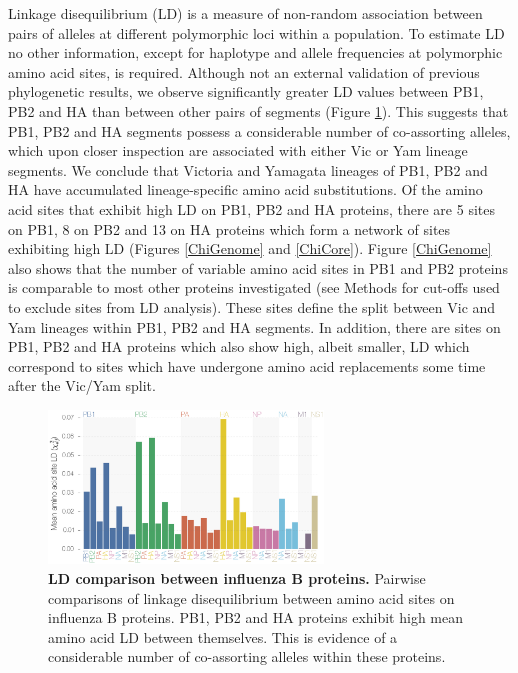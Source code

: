 \documentclass[11pt,oneside,letterpaper]{article}
\begin{document}
Linkage disequilibrium (LD) is a measure of non-random association between pairs of alleles at different polymorphic loci within a population.
To estimate LD no other information, except for haplotype and allele frequencies at polymorphic amino acid sites, is required.
Although not an external validation of previous phylogenetic results, we observe significantly greater LD values between PB1, PB2 and HA than between other pairs of segments (Figure \ref{segmentLD}).
This suggests that PB1, PB2 and HA segments possess a considerable number of co-assorting alleles, which upon closer inspection are associated with either Vic or Yam lineage segments.
We conclude that Victoria and Yamagata lineages of PB1, PB2 and HA have accumulated lineage-specific amino acid substitutions.
Of the amino acid sites that exhibit high LD on PB1, PB2 and HA proteins, there are 5 sites on PB1, 8 on PB2 and 13 on HA proteins which form a network of sites exhibiting high LD (Figures \ref{ChiGenome} and \ref{ChiCore}).
Figure \ref{ChiGenome} also shows that the number of variable amino acid sites in PB1 and PB2 proteins is comparable to most other proteins investigated (see Methods for cut-offs used to exclude sites from LD analysis).
These sites define the split between Vic and Yam lineages within PB1, PB2 and HA segments.
In addition, there are sites on PB1, PB2 and HA proteins which also show high, albeit smaller, LD which correspond to sites which have undergone amino acid replacements some time after the Vic/Yam split.

\begin{figure}[h]
	\centering	
	\includegraphics[width=0.65\textwidth]{figures/InfB_aaMeanLD.png}
	\caption{\textbf{LD comparison between influenza B proteins.}
Pairwise comparisons of linkage disequilibrium between amino acid sites on influenza B proteins.
PB1, PB2 and HA proteins exhibit high mean amino acid LD between themselves.
This is evidence of a considerable number of co-assorting alleles within these proteins.}
	\label{segmentLD}
\end{figure}
\end{document}
